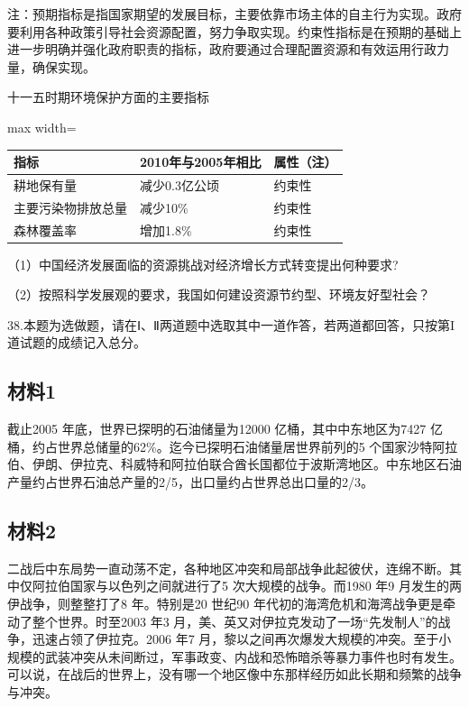 \documentclass[UTF8,11pt]{ctexart}
\begin{document}
注：预期指标是指国家期望的发展目标，主要依靠市场主体的自主行为实现。政府要利用各种政策引导社会资源配置，努力争取实现。约束性指标是在预期的基础上进一步明确并强化政府职责的指标，政府要通过合理配置资源和有效运用行政力量，确保实现。


十一五时期环境保护方面的主要指标


\begin{center}\begin{adjustbox}{max width=\linewidth}\begin{tabular}{|>{\raggedright\arraybackslash}p{\dimexpr(\linewidth-6\tabcolsep-4\arrayrulewidth)/3\relax}|>{\raggedright\arraybackslash}p{\dimexpr(\linewidth-6\tabcolsep-4\arrayrulewidth)/3\relax}|>{\raggedright\arraybackslash}p{\dimexpr(\linewidth-6\tabcolsep-4\arrayrulewidth)/3\relax}|}\hline
指标 & 2010年与2005年相比 & 属性（注）\\\hline
耕地保有量 & 减少0.\allowbreak{}3亿公顷 & 约束性\\\hline
主要污染物排放总量 & 减少10\% & 约束性\\\hline
森林覆盖率 & 增加1.\allowbreak{}8\% & 约束性\\\hline\end{tabular}\end{adjustbox}\end{center}

（1）中国经济发展面临的资源挑战对经济增长方式转变提出何种要求?


（2）按照科学发展观的要求，我国如何建设资源节约型、环境友好型社会？


38.本题为选做题，请在Ⅰ、Ⅱ两道题中选取其中一道作答，若两道都回答，只按第Ι道试题的成绩记入总分。


\subsection*{材料1}

截止2005 年底，世界已探明的石油储量为12000 亿桶，其中中东地区为7427 亿桶，约占世界总储量的62\%。迄今已探明石油储量居世界前列的5 个国家沙特阿拉伯、伊朗、伊拉克、科威特和阿拉伯联合酋长国都位于波斯湾地区。中东地区石油产量约占世界石油总产量的2/5，出口量约占世界总出口量的2/3。


\subsection*{材料2}

二战后中东局势一直动荡不定，各种地区冲突和局部战争此起彼伏，连绵不断。其中仅阿拉伯国家与以色列之间就进行了5 次大规模的战争。而1980 年9 月发生的两伊战争，则整整打了8 年。特别是20 世纪90 年代初的海湾危机和海湾战争更是牵动了整个世界。时至2003 年3 月，美、英又对伊拉克发动了一场“先发制人”的战争，迅速占领了伊拉克。2006 年7 月，黎以之间再次爆发大规模的冲突。至于小规模的武装冲突从未间断过，军事政变、内战和恐怖暗杀等暴力事件也时有发生。可以说，在战后的世界上，没有哪一个地区像中东那样经历如此长期和频繁的战争与冲突。
\end{document}
